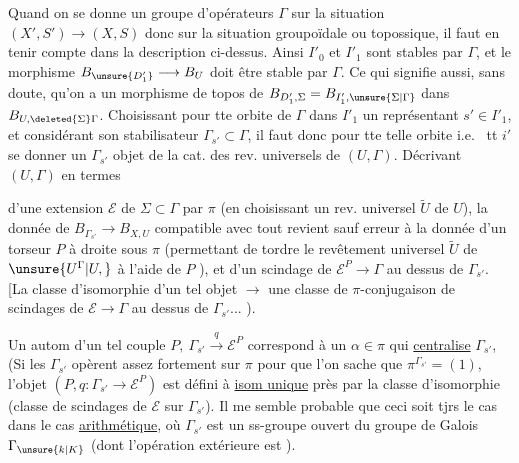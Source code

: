 
Quand on se donne un groupe d'opérateurs \deleted{$\Sigma$}$\Gamma$ sur la situation $(X',S')\longrightarrow(X,S)$ donc sur la situation groupoïdale ou topossique, il faut en tenir compte dans la description ci-dessus.
Ainsi $I'_0$ et $I'_1$ sont stables par $\Gamma$, et le morphisme  $B_{\unsure{D'_1}}\longrightarrow B_U$ doit être stable par $\Gamma$.
Ce qui signifie aussi, sans doute, qu'on a un morphisme de topos de
$B_{D'_1,\Sigma}=B_{I'_1,\unsure{\Sigma|\Gamma}}$
dans $B_{U,\deleted{\Sigma}\Gamma}$.
Choisissant pour tte orbite de $\Gamma$ dans $I'_1$ un représentant $s'\in I'_1$, et considérant son stabilisateur $\Gamma_{s'}\subset\Gamma$, il faut donc pour tte telle orbite i.e.\  tt $i'$ se donner un $\Gamma_{s'}$ objet de la cat. des rev. universels de $(U,\Gamma)$.
  Décrivant $(U,\Gamma)$ en termes


d'une extension $\mathcal E$ de $\Sigma\subset\Gamma$ par $\pi$ (en choisissant un rev. universel $\widetilde U$ de $U$), la donnée de $B_{\Gamma_{s'}}\longrightarrow B_{X,U}$ compatible avec tout revient sauf erreur à la donnée d'un torseur $P$ à droite sous $\pi$ (permettant de tordre le revêtement universel  $\widetilde U$ de $\unsure{U^\Gamma|U,}$ à l'aide de $P$  ), et d'un scindage de $\mathcal E^P\longrightarrow\Gamma$ au dessus de $\Gamma_{s'}$.
[La classe d'isomorphie d'un tel objet $\longrightarrow$ une classe de $\pi$-conjugaison de scindages de $\mathcal E\longrightarrow\Gamma$ au dessus de $\Gamma_{s'}$... ).

Un autom d'un tel couple  $P,\ \Gamma_{s'}\xrightarrow{q}\mathcal E^P$ correspond à un $\alpha\in\pi$ qui \uline{centralise} $\Gamma_{s'}$,  (Si les $\Gamma_{s'}$ opèrent assez fortement sur $\pi$ pour que l'on sache que $\pi^{\Gamma_{s'}}=(1)$, l'objet $(P,q:\Gamma_{s'}\longrightarrow\mathcal E^P)$ est défini à \uline{isom unique} près par la classe d'isomorphie  (classe de scindages de $\mathcal E$ sur $\Gamma_{s'}$).
Il me semble probable que ceci soit tjrs le cas dans le cas \uline{arithmétique}, où $\Gamma_{s'}$ est un ss-groupe ouvert du groupe de Galois $\Gamma_{\unsure{k|K}}$ (dont l'opération extérieure est ).


